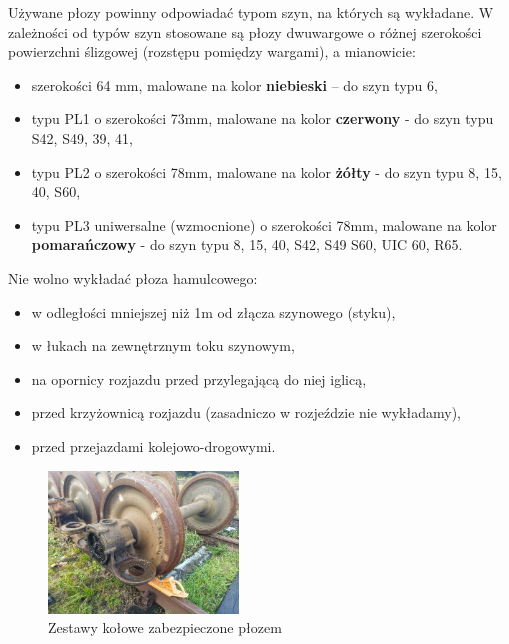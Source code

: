Używane płozy powinny odpowiadać typom szyn, na których są wykładane. W zależności od typów szyn stosowane są płozy dwuwargowe o różnej szerokości powierzchni ślizgowej (rozstępu pomiędzy wargami), a mianowicie:

\begin{itemize}
	\item szerokości 64 mm, malowane na kolor \textbf{niebieski} – do szyn typu 6,
	\item typu PL1 o szerokości 73mm, malowane na kolor \textbf{czerwony} - do szyn typu S42, S49, 39, 41,
	\item typu PL2 o szerokości 78mm, malowane na kolor \textbf{żółty} - do szyn typu 8, 15, 40, S60,
	\item typu PL3 uniwersalne (wzmocnione) o szerokości 78mm, malowane na kolor \textbf{pomarańczowy} - do szyn typu 8, 15, 40, S42, S49 S60, UIC
	60, R65.
\end{itemize}

Nie wolno wykładać płoza hamulcowego:
\begin{itemize}
	\item w odległości mniejszej niż 1m od złącza szynowego (styku),
	\item w łukach na zewnętrznym toku szynowym,
	\item na opornicy rozjazdu przed przylegającą do niej iglicą,
	\item przed krzyżownicą rozjazdu (zasadniczo w rozjeździe nie wykładamy),
	\item przed przejazdami kolejowo-drogowymi.
\end{itemize}
\begin{figure}[h]
	\includegraphics[width=0.45\textwidth]{skryptkierownik-img/ploz.jpg}
	\caption{Zestawy kołowe zabezpieczone płozem}
\end{figure} 